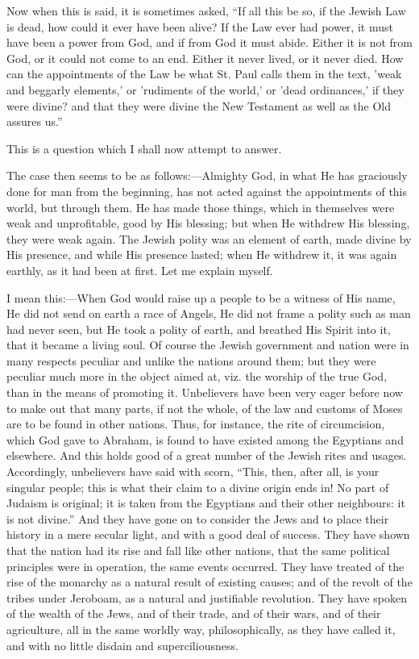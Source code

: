 Now when this is said, it is sometimes asked, ``If all this be
so, if the Jewish Law is dead, how could it ever have been alive? If
the Law ever had power, it must have been a power from God, and if
from God it must abide. Either it is not from God, or it could not
come to an end. Either it never lived, or it never died. How can the
appointments of the Law be what St. Paul calls them in the text, 'weak
and beggarly elements,' or 'rudiments of the world,' or 'dead
ordinances,' if they were divine? and that they were divine the New
Testament as well as the Old assures us.''

This is a question which I shall now attempt to answer.

The case
then seems to be as follows:—Almighty God, in what He has graciously
done for man from the beginning, has not acted against the
appointments of this world, but through them. He has made those
things, which in themselves were weak and unprofitable, good by His
blessing; but when He withdrew His blessing, they were weak again. The
Jewish polity was an element of earth, made divine by His presence,
and while His presence lasted; when He withdrew it, it was again
earthly, as it had been at first. Let me explain myself.

I mean this:—When God would raise up a people to be a witness of
His name, He did not send on earth a race of Angels, He did not frame
a polity such as man had never seen, but He took a polity of earth,
and breathed His Spirit into it, that it became a living soul. Of
course the Jewish government and nation were in many respects peculiar
and unlike the nations around them; but they were peculiar much more
in the object aimed at, viz. the worship of the true God, than in the
means of promoting it. Unbelievers have been very eager before now to
make out that many parts, if not the whole, of the law and customs of
Moses are to be found in other nations. Thus, for instance, the rite
of circumcision, which God gave to Abraham, is found to have existed
among the Egyptians and elsewhere. And this holds good of a great
number of the Jewish rites and usages. Accordingly, unbelievers have
said with scorn, ``This, then, after all, is your singular people;
this is what their claim to a divine origin ends in! No part of
Judaism is original; it is taken from the Egyptians and their other
neighbours: it is not divine.'' And they have gone on to consider
the Jews and to place their history in a mere secular light, and with
a good deal of success. They have shown that the nation had its rise
and fall like other nations, that the same political principles were
in operation, the same events occurred. They have treated of the rise
of the monarchy as a natural result of existing causes; and of the
revolt of the tribes under Jeroboam, as a natural and justifiable
revolution. They have spoken of the wealth of the Jews, and of their
trade, and of their wars, and of their agriculture, all in the same
worldly way, philosophically, as they have called it, and with no
little disdain and superciliousness.

